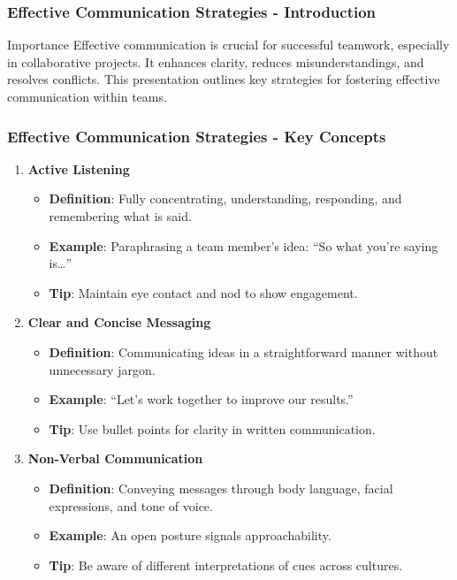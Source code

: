 \documentclass[aspectratio=169]{beamer}
\begin{document}
\begin{frame}[fragile]
    \frametitle{Effective Communication Strategies - Introduction}
    \begin{block}{Importance}
        Effective communication is crucial for successful teamwork, especially in collaborative projects. 
        It enhances clarity, reduces misunderstandings, and resolves conflicts. This presentation outlines key strategies for fostering effective communication within teams.
    \end{block}
\end{frame}

\begin{frame}[fragile]
    \frametitle{Effective Communication Strategies - Key Concepts}
    \begin{enumerate}
        \item \textbf{Active Listening}
        \begin{itemize}
            \item \textbf{Definition}: Fully concentrating, understanding, responding, and remembering what is said.
            \item \textbf{Example}: Paraphrasing a team member's idea: “So what you’re saying is…”
            \item \textbf{Tip}: Maintain eye contact and nod to show engagement.
        \end{itemize}

        \item \textbf{Clear and Concise Messaging}
        \begin{itemize}
            \item \textbf{Definition}: Communicating ideas in a straightforward manner without unnecessary jargon.
            \item \textbf{Example}: “Let’s work together to improve our results.”
            \item \textbf{Tip}: Use bullet points for clarity in written communication.
        \end{itemize}

        \item \textbf{Non-Verbal Communication}
        \begin{itemize}
            \item \textbf{Definition}: Conveying messages through body language, facial expressions, and tone of voice.
            \item \textbf{Example}: An open posture signals approachability.
            \item \textbf{Tip}: Be aware of different interpretations of cues across cultures.
        \end{itemize}
    \end{enumerate}
\end{frame}
\end{document}
